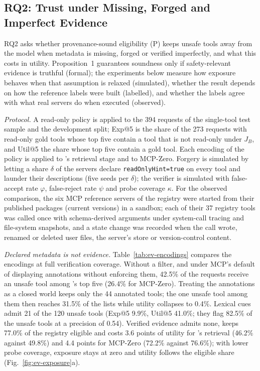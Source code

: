 \subsection{RQ2: Trust under Missing, Forged and Imperfect Evidence}
\label{sec:ev-rq2}

RQ2 asks whether provenance-sound eligibility (P) keeps unsafe tools away from the model when metadata is
missing, forged or verified imperfectly, and what this costs in utility. Proposition~1 guarantees soundness only
if safety-relevant evidence is truthful (formal); the experiments below measure how exposure behaves when that
assumption is relaxed (simulated), whether the result depends on how the reference labels were built
(labelled), and whether the labels agree with what real servers do when executed (observed).

\emph{Protocol.} A read-only policy is applied to the 394 requests of the single-tool test sample and the
development split; Exp@5 is the share of the 273 requests with read-only gold tools whose top five contain a
tool that is not read-only under $J_B$, and Util@5 the share whose top five contain a gold tool. Each encoding of
the policy is applied to \pamcp{}'s retrieval stage and to MCP-Zero. Forgery is simulated by letting a share
$\delta$ of the servers declare \texttt{readOnlyHint=true} on every tool and launder their descriptions (five
seeds per $\delta$); the verifier is simulated with false-accept rate $\varphi$, false-reject rate $\psi$ and
probe coverage $\kappa$. For the observed comparison, the six MCP reference servers of the registry were started
from their published packages (current versions) in a sandbox; each of their 37 registry tools was called once
with schema-derived arguments under system-call tracing and file-system snapshots, and a state change was
recorded when the call wrote, renamed or deleted user files, the server's store or version-control content.



\emph{Declared metadata is not evidence.} Table~\ref{tab:ev-encodings} compares the encodings at full
verification coverage. Without a filter, and under MCP's default of displaying annotations without enforcing
them, 42.5\% of the requests receive an unsafe tool among \pamcp{}'s top five (26.4\% for MCP-Zero). Treating
the annotations as a closed world keeps only the 44 annotated tools; the one unsafe tool among them then reaches
31.5\% of the lists while utility collapses to 0.4\%. Lexical cues admit 21 of the 120 unsafe tools (Exp@5 9.9\%,
Util@5 41.0\%; they flag 82.5\% of the unsafe tools at a precision of 0.54). Verified evidence admits none, keeps
77.0\% of the registry eligible and costs 3.6 points of utility for \pamcp{}'s retrieval (46.2\% against 49.8\%)
and 4.4 points for MCP-Zero (72.2\% against 76.6\%); with lower probe coverage, exposure stays at zero and utility
follows the eligible share (Fig.~\ref{fig:ev-exposure}a).

